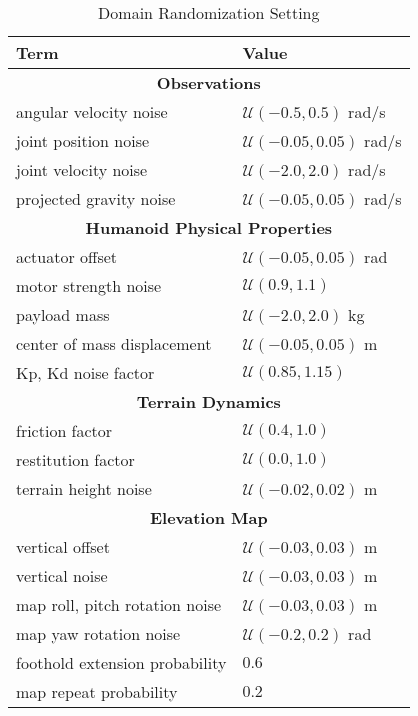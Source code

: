 \begin{table}[h]
    \centering
    \caption{Domain Randomization Setting}
    \begin{tabular}{ll}
    \toprule[1.0pt]
    \textbf{Term} & \textbf{Value}\\
    
    \midrule[0.8pt]
    \multicolumn{2}{c}{\textbf{Observations}} \\ [0.3ex]
    angular velocity noise & $\mathcal{U}(-0.5, 0.5)$ rad/s \\ %
    joint position noise & $\mathcal{U}(-0.05, 0.05)$ rad/s \\ %
    joint velocity noise & $\mathcal{U}(-2.0, 2.0)$ rad/s \\ %
    projected gravity noise & $\mathcal{U}(-0.05, 0.05)$ rad/s \\ %
    
    \midrule[0.5pt] 
    \multicolumn{2}{c}{\textbf{Humanoid Physical Properties}} \\ [0.3ex]
    actuator offset & $\mathcal{U}(-0.05, 0.05)$ rad \\ %
    motor strength noise & $\mathcal{U}(0.9, 1.1)$ \\ %
    payload mass & $\mathcal{U}(-2.0, 2.0)$ kg \\ %
    center of mass displacement & $\mathcal{U}(-0.05, 0.05)$ m \\ %
    Kp, Kd noise factor & $\mathcal{U}(0.85, 1.15)$ \\ %

    \midrule[0.5pt] 
    \multicolumn{2}{c}{\textbf{Terrain Dynamics}} \\ [0.3ex]
    friction factor & $\mathcal{U}(0.4, 1.0)$ \\ %
    restitution factor & $\mathcal{U}(0.0, 1.0)$ \\ %
    terrain height noise & $\mathcal{U}(-0.02, 0.02)$ m \\ %

    \midrule[0.5pt] 
    \multicolumn{2}{c}{\textbf{Elevation Map}} \\ [0.3ex]
    vertical offset & $\mathcal{U}(-0.03, 0.03)$ m \\ %
    vertical noise & $\mathcal{U}(-0.03, 0.03)$ m \\ %
    map roll, pitch rotation noise & $\mathcal{U}(-0.03, 0.03)$ m \\ %
    map yaw rotation noise & $\mathcal{U}(-0.2, 0.2)$ rad \\ %
    foothold extension probability & $0.6$ \\ %
    map repeat probability & $0.2$ \\ %
    
    \bottomrule[1.0pt]
    \end{tabular}
    \label{tab:domain_random}
\end{table}